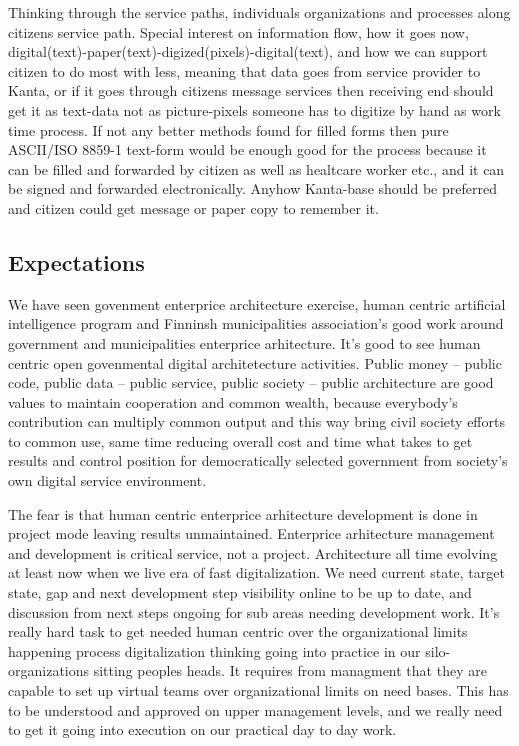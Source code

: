 Thinking through the service paths, individuals organizations and processes
along citizens service path. Special interest on information flow, how it goes
now, digital(text)-paper(text)-digized(pixels)-digital(text)\cite{VM006_00_2024},
and how we can support citizen to do most with less, meaning that data goes
from service provider to Kanta, or if it goes through citizens message services
then receiving end should get it as text-data not as picture-pixels someone
has to digitize by hand as work time process. If not any better methods found
for filled forms then pure ASCII/ISO 8859-1 text-form would be enough good for
the process because it can be filled and forwarded by citizen as well as
healtcare worker etc., and it can be signed and forwarded electronically.
Anyhow Kanta-base should be preferred and citizen could get message or paper
copy to remember it.

\subsection{Expectations}
\label{expectations}

We have seen govenment enterprice architecture exercise, human centric
artificial intelligence program and Finninsh municipalities association's good
work around government and municipalities enterprice arhitecture. It's good
to see human centric open govenmental digital architetecture activities.
Public money -- public code, public data -- public service, public society --
public architecture are good values to maintain cooperation and common wealth,
because everybody's contribution can multiply common output and this way bring
civil society efforts to common use, same time reducing overall cost and time
what takes to get results and control position for democratically selected
government from society's own digital service environment.

The fear is that human centric enterprice arhitecture development is done in
project mode leaving results unmaintained. Enterprice arhitecture management
and development is critical service, not a project. Architecture all time
evolving at least now when we live era of fast digitalization. We need current
state, target state, gap and next development step visibility online to be up
to date, and discussion from next steps ongoing for sub areas needing
development work. It's really hard task to get needed human centric over the
organizational limits happening process digitalization thinking going into
practice in our silo-organizations sitting peoples heads. It requires from
managment that they are capable to set up virtual teams over organizational
limits on need bases. This has to be understood and approved on upper
management levels, and we really need to get it going into execution on our
practical day to day work.

